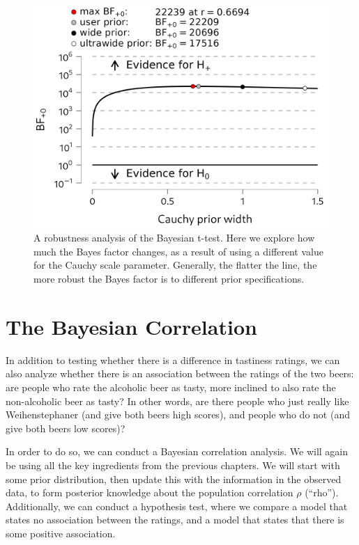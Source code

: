 \documentclass[
]{book}
\begin{document}
\begin{figure}

{\centering \includegraphics[width=0.9\linewidth]{Figures/TTestBeerTastinessRobustness} 

}

\caption{A robustness analysis of the Bayesian t-test. Here we explore how much the Bayes factor changes, as a result of using a different value for the Cauchy scale parameter. Generally, the flatter the line, the more robust the Bayes factor is to different prior specifications.}\label{fig:beer-tastiness-t-test-robustness}
\end{figure}

\hypertarget{the-bayesian-correlation}{%
\section{The Bayesian Correlation}\label{the-bayesian-correlation}}

In addition to testing whether there is a difference in tastiness ratings, we can also analyze whether there is an association between the ratings of the two beers: are people who rate the alcoholic beer as tasty, more inclined to also rate the non-alcoholic beer as tasty? In other words, are there people who just really like Weihenstephaner (and give both beers high scores), and people who do not (and give both beers low scores)?

In order to do so, we can conduct a Bayesian correlation analysis. We will again be using all the key ingredients from the previous chapters. We will start with some prior distribution, then update this with the information in the observed data, to form posterior knowledge about the population correlation \(\rho\) (``rho''). Additionally, we can conduct a hypothesis test, where we compare a model that states no association between the ratings, and a model that states that there is some positive association.
\end{document}

